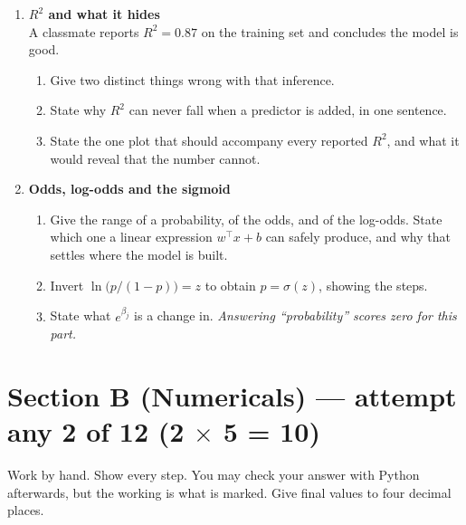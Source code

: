 \documentclass[11pt,a4paper]{article}
\begin{document}
\begin{enumerate}[label=\textbf{A\arabic*.}, leftmargin=*]
  \item \textbf{$R^2$ and what it hides} \\
    A classmate reports $R^2 = 0.87$ on the training set and concludes the
    model is good.
    \begin{enumerate}[label=(\alph*), leftmargin=*]
      \item Give two distinct things wrong with that inference.
      \item State why $R^2$ can never fall when a predictor is added, in one
        sentence.
      \item State the one plot that should accompany every reported $R^2$, and
        what it would reveal that the number cannot.
    \end{enumerate}

  \item \textbf{Odds, log-odds and the sigmoid} \\
    \begin{enumerate}[label=(\alph*), leftmargin=*]
      \item Give the range of a probability, of the odds, and of the log-odds.
        State which one a linear expression $w^\top x + b$ can safely produce,
        and why that settles where the model is built.
      \item Invert $\ln\!\big(p/(1-p)\big) = z$ to obtain $p = \sigma(z)$,
        showing the steps.
      \item State what $e^{\beta_j}$ is a change in. \emph{Answering
        ``probability'' scores zero for this part.}
    \end{enumerate}

\end{enumerate}

\section*{Section B (Numericals) --- attempt any 2 of 12 \quad (2 $\times$ 5 = 10)}

\noindent\small Work by hand. Show every step. You may check your answer with
Python afterwards, but the working is what is marked. Give final values to four
decimal places.\normalsize
\end{document}
